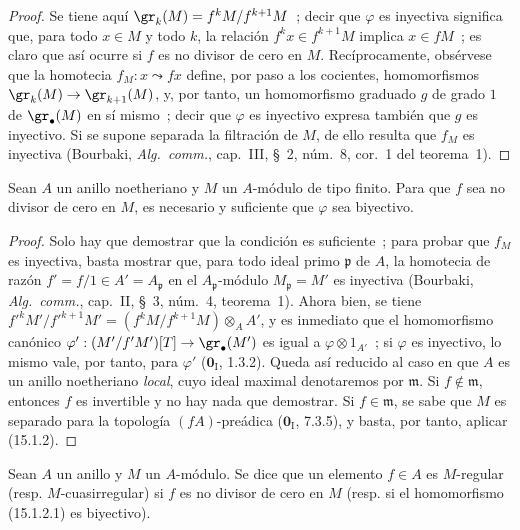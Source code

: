\begin{proof}
Se tiene aquí $\gr_k(M)=f^kM/f^{k+1}M$~; decir que $\varphi$ es inyectiva
significa que, para todo $x\in M$ y todo $k$, la relación
$f^kx\in f^{k+1}M$ implica $x\in fM$~; es claro que así ocurre si $f$ es no
divisor de cero en $M$. Recíprocamente, obsérvese que la homotecia
$f_M:x\leadsto fx$ define, por paso a los cocientes, homomorfismos
$\gr_k(M)\to\gr_{k+1}(M)$, y, por tanto, un homomorfismo graduado $g$ de grado
$1$ de $\gr_\bullet(M)$ en sí mismo~; decir que $\varphi$ es inyectivo expresa
también que $g$ es inyectivo. Si se supone separada la filtración de $M$, de
ello resulta que $f_M$ es inyectiva (Bourbaki, \emph{Alg.~comm.}, cap.~III,
\S~2, núm.~8, cor.~1 del teorema~1).
\end{proof}

\begin{corollary}[15.1.3]
\label{0.15.1.3-es}
Sean $A$ un anillo noetheriano y $M$ un $A$-módulo de tipo finito. Para que
$f$ sea no divisor de cero en $M$, es necesario y suficiente que $\varphi$ sea
biyectivo.
\end{corollary}

\begin{proof}
Solo hay que demostrar que la condición es suficiente~; para probar que $f_M$
es inyectiva, basta mostrar que, para todo ideal primo $\mathfrak p$ de $A$,
la homotecia de razón $f'=f/1\in A'=A_{\mathfrak p}$ en el
$A_{\mathfrak p}$-módulo $M_{\mathfrak p}=M'$ es inyectiva (Bourbaki,
\emph{Alg.~comm.}, cap.~II, \S~3, núm.~4, teorema~1). Ahora bien, se tiene
$f'^kM'/f'^{k+1}M'=(f^kM/f^{k+1}M)\otimes_A A'$, y es inmediato que
el homomorfismo canónico $\varphi':(M'/f'M')[T]\to\gr_\bullet(M')$ es igual a
$\varphi\otimes 1_{A'}$~; si $\varphi$ es inyectivo, lo mismo vale, por tanto,
para $\varphi'$ ($\mathbf{0}_{\mathrm I}$, 1.3.2). Queda así reducido al caso en que $A$
es un anillo noetheriano \emph{local}, cuyo ideal maximal denotaremos por
$\mathfrak m$. Si $f\notin\mathfrak m$, entonces $f$ es invertible y no hay
nada que demostrar. Si $f\in\mathfrak m$, se sabe que $M$ es separado para la
topología $(fA)$-preádica ($\mathbf{0}_{\mathrm I}$, 7.3.5), y basta, por tanto,
aplicar (15.1.2).
\end{proof}

\begin{definition}[15.1.4]
\label{0.15.1.4-es}
Sean $A$ un anillo y $M$ un $A$-módulo. Se dice que un elemento $f\in A$ es
$M$-regular (\textup{resp.} $M$-cuasirregular) si $f$ es no divisor de
cero en $M$ (\textup{resp.} si el homomorfismo (15.1.2.1) es biyectivo).
\end{definition}

